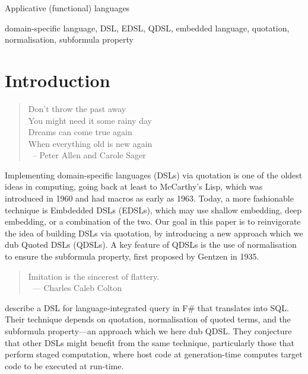 \documentclass[authoryear,9pt]{sigplanconf}
\newcommand{\flushr}{{}\mbox{~}\hfill}%
\begin{document}
                {Applicative (functional) languages}


\keywords
domain-specific language, DSL, EDSL, QDSL,
embedded language,
quotation, normalisation, subformula property


\section{Introduction}
\label{sec:introduction}



\begin{quote}
Don't throw the past away \\
You might need it some rainy day \\
Dreams can come true again \\
When everything old is new again \\
\flushr -- Peter Allen and Carole Sager
\end{quote}

Implementing domain-specific languages (DSLs) via quotation is one of
the oldest ideas in computing, going back at least to McCarthy's Lisp,
which was introduced in 1960 and had macros as early as 1963.  Today,
a more fashionable technique is Embdedded DSLs (EDSLs), which may use
shallow embedding, deep embedding, or a combination of the two. Our
goal in this paper is to reinvigorate the idea of building DSLs via
quotation, by introducing a new approach which we dub Quoted DSLs
(QDSLs).  A key feature of QDSLs is the use of normalisation to ensure
the subformula property, first proposed by Gentzen in 1935.

\vspace{2ex}
\begin{quote}
Imitation is the sincerest of flattery. \\
\flushr --- Charles Caleb Colton
\end{quote}

\citet{cheney:linq} describe a DSL for language-integrated query in
F\# that translates into SQL.  Their technique depends on quotation,
normalisation of quoted terms, and the subformula property---an
approach which we here dub QDSL.  They conjecture that other DSLs might
benefit from the same technique, particularly those that perform
staged computation, where host code at generation-time computes target
code to be executed at run-time.
\end{document}
